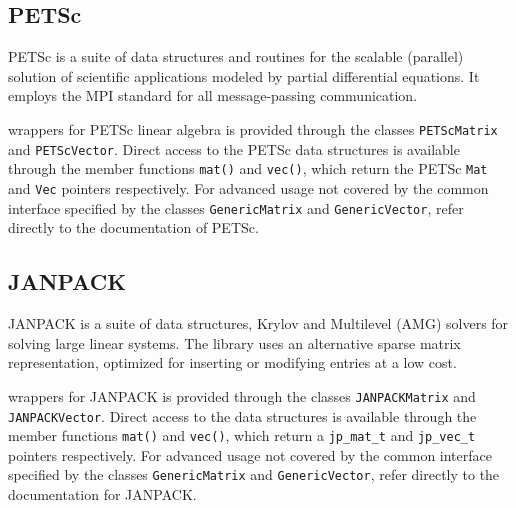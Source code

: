 \subsection{PETSc}
%
PETSc is a suite of data structures and routines for the scalable
(parallel) solution of scientific applications modeled by partial
differential equations. It employs the MPI standard for all 
message-passing communication.

\dolfin{} wrappers for PETSc linear algebra is provided through the
classes \texttt{PETScMatrix} and \texttt{PETScVector}. Direct access
to the PETSc data structures is available through the member functions
\texttt{mat()} and \texttt{vec()}, which return the PETSc \texttt{Mat}
and \texttt{Vec} pointers respectively. For advanced usage not covered
by the common \dolfin{} interface specified by the classes
\texttt{GenericMatrix} and \texttt{GenericVector}, refer directly to
the documentation of PETSc.
\subsection{JANPACK}

JANPACK is a suite of data structures, Krylov and Multilevel (AMG)
solvers for solving large linear systems. The library uses an
alternative sparse matrix representation, optimized for inserting or
modifying entries at a low cost.

\dolfin{} wrappers for JANPACK is provided through the classes
\texttt{JANPACKMatrix} and \texttt{JANPACKVector}. Direct access to
the data structures is available through the member functions
\texttt{mat()} and \texttt{vec()}, which return a \verb|jp_mat_t|
and \verb|jp_vec_t| pointers respectively. For advanced usage not
covered by the common \dolfin{} interface specified by the classes
\texttt{GenericMatrix} and \texttt{GenericVector}, refer directly to
the documentation for JANPACK.
